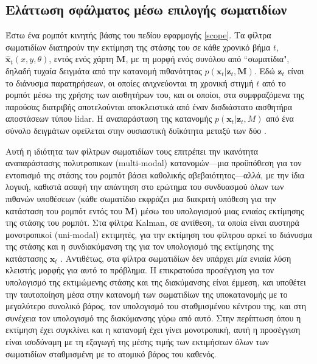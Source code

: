 \subsection{Ελάττωση σφάλματος μέσω επιλογής σωματιδίων}
\label{subsection:02_02_03:01}

Έστω ένα ρομπότ κινητής βάσης του πεδίου εφαρμογής \ref{scope}. Τα φίλτρα
σωματιδίων διατηρούν την εκτίμηση της στάσης του σε κάθε χρονικό βήμα
$t$, $\hat{\bm{x}}_t (x, y, \theta)$, εντός ενός χάρτη $\bm{M}$, με τη μορφή
ενός συνόλου από ``σωματίδια", δηλαδή τυχαία δειγμάτα από την κατανομή
πιθανότητας $p(\bm{x}_t | \bm{z}_t, \bm{M})$. Εδώ $\bm{z}_t$ είναι το διάνυσμα
παρατηρήσεων, οι οποίες ανιχνεύονται τη χρονική στιγμή $t$ από το ρομπότ μέσω
της χρήσης των αισθητήρων του, και οι οποίοι, στα συμφραζόμενα της παρούσας
διατριβής αποτελούνται αποκλειστικά από έναν δισδιάστατο αισθητήρα αποστάσεων
τύπου lidar. H αναπαράσταση της κατανομής $p(\bm{x}_t | \bm{z}_t, M)$ από ένα
σύνολο δειγμάτων οφείλεται στην ουσιαστική δυϊκότητα μεταξύ των δύο
\cite{Smith1992}.

Αυτή η ιδιότητα των φίλτρων σωματιδίων τους επιτρέπει την ικανότητα
αναπαράστασης πολυτροπικων (multi-modal) κατανομών---μια προϋπόθεση για τον
εντοπισμό της στάσης του ρομπότ βάσει καθολικής αβεβαιότητος---αλλά, με την
ίδια λογική, καθιστά ασαφή την απάντηση στο ερώτημα του συνδυασμού όλων των
πιθανών υποθέσεων (κάθε σωματίδιο εκφράζει μια διακριτή υπόθεση για την
κατάσταση του ρομπότ εντός του $\bm{M}$) μέσω του υπολογισμού μιας ενιαίας
εκτίμησης της στάσης του ρομπότ. Στα φίλτρα Kalman, σε αντίθεση, τα οποία είναι
αυστηρά μονοτροπικoί (uni-modal) εκτιμητές, για την εκτίμηση του φίλτρου αρκεί
το διάνυσμα της στάσης και η συνδιακύμανση της για τον υπολογισμό της εκτίμησης
της κατάστασης $\bm{x}_t$ \cite{Maybeck1979}. Αντιθέτως, στα φίλτρα σωματιδίων
δεν υπάρχει \textit{μία} ενιαία λύση κλειστής μορφής για αυτό το πρόβλημα. Η
επικρατούσα προσέγγιση για τον υπολογισμό της εκτιμώμενης στάσης και της
διακύμανσης είναι έμμεση, και υποθέτει την ταυτοποίηση μέσα στην κατανομή των
σωματιδίων της υποκατανομής με το μεγαλύτερο συνολικό βάρος, τον υπολογισμό
του σταθμισμένου κέντρου της, και στη συνέχεια τον υπολογισμό της διακύμανσης
γύρω από αυτό.  Στην περίπτωση όπου η εκτίμηση έχει συγκλίνει και η κατανομή
έχει γίνει μονοτροπική, αυτή η προσέγγιση είναι ισοδύναμη με τη εξαγωγή της
μέσης τιμής των εκτιμήσεων όλων των σωματιδίων σταθμισμένη με το ατομικό βάρος
του καθενός.

